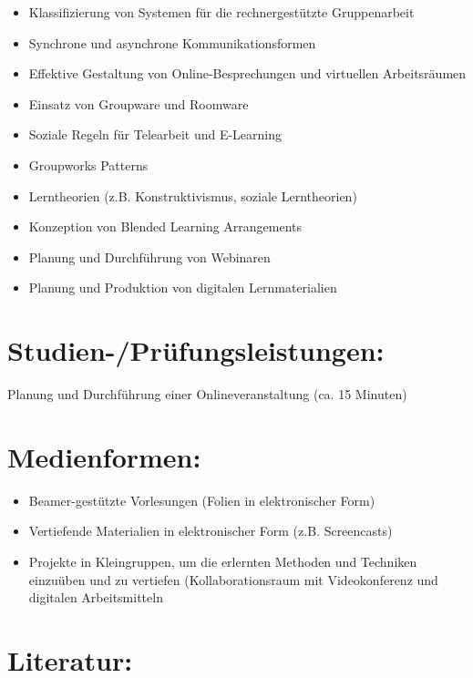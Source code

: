 \begin{itemize}
\item
  Klassifizierung von Systemen für die rechnergestützte Gruppenarbeit
\item
  Synchrone und asynchrone Kommunikationsformen
\item
  Effektive Gestaltung von Online-Besprechungen und virtuellen
  Arbeitsräumen
\item
  Einsatz von Groupware und Roomware
\item
  Soziale Regeln für Telearbeit und E-Learning
\item
  Groupworks Patterns
\item
  Lerntheorien (z.B. Konstruktivismus, soziale Lerntheorien)
\item
  Konzeption von Blended Learning Arrangements
\item
  Planung und Durchführung von Webinaren
\item
  Planung und Produktion von digitalen Lernmaterialien
\end{itemize}

\section*{Studien-/Prüfungsleistungen:}\label{studien-pruxfcfungsleistungen-13}

Planung und Durchführung einer Onlineveranstaltung (ca. 15 Minuten)

\section*{Medienformen:}\label{medienformen-13}

\begin{itemize}
\item
  Beamer-gestützte Vorlesungen (Folien in elektronischer Form)
\item
  Vertiefende Materialien in elektronischer Form (z.B. Screencasts)
\item
  Projekte in Kleingruppen, um die erlernten Methoden und Techniken
  einzuüben und zu vertiefen (Kollaborationsraum mit Videokonferenz und
  digitalen Arbeitsmitteln
\end{itemize}

\section*{Literatur:}\label{literatur-10}

